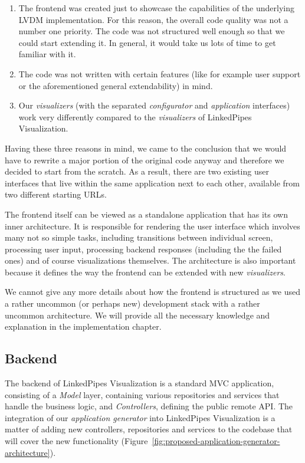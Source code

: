 \begin{enumerate}
\item The frontend was created just to showcase the capabilities of the underlying LVDM implementation. For this reason, the overall code quality was not  a number one priority. The code was not structured well enough so that we could start extending it. In general, it would take us lots of time to get familiar with it. 
\item The code was not written with certain features (like for example user support or the aforementioned general extendability) in mind.
\item Our \emph{visualizers} (with the separated \emph{configurator} and \emph{application} interfaces) work very differently compared to the \emph{visualizers} of LinkedPipes Visualization.

\end{enumerate}
Having these three reasons in mind, we came to the conclusion that we would have to rewrite a major portion of the original code anyway and therefore we decided to start from the scratch. As a result, there are two existing user interfaces that live within the same application next to each other, available from two different starting URLs.

The frontend itself can be viewed as a standalone application that has its own inner architecture. It is responsible for rendering the user interface which involves many not so simple tasks, including transitions between individual screen, processing user input, processing backend responses (including the the failed ones) and of course visualizations themselves. The architecture is also important because it defines the way the frontend can be extended with new \emph{visualizers}. 

We cannot give any more details about how the frontend is structured as we used a rather uncommon (or perhaps new) development stack with a rather uncommon architecture. We will provide all the necessary knowledge and explanation in the implementation chapter.

\subsection{Backend}

The backend of LinkedPipes Visualization is a standard MVC application, consisting of a \emph{Model} layer, containing various repositories and services that handle the business logic, and \emph{Controllers}, defining the public remote API. The integration of our \emph{application generator} into LinkedPipes Visualization is a matter of adding new controllers, repositories and services to the codebase that will cover the new functionality (Figure~\ref{fig:proposed-application-generator-architecture}).

